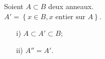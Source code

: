 \begin{maproposition}
	Soient $A \subset B$ deux anneaux.\\
	$A' =\left\{x \in B, x\text{ entier sur } A\right\}$.
	\begin{enumerate}
		\item[i)] $A \subset A' \subset B $;
		\item[ii)] $A'' = A'$.
	\end{enumerate}
\end{maproposition}
